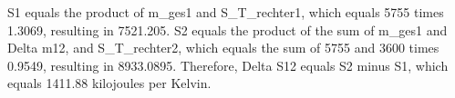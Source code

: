 S1 equals the product of m_ges1 and S_T_rechter1, which equals 5755 times 1.3069, resulting in 7521.205.
S2 equals the product of the sum of m_ges1 and Delta m12, and S_T_rechter2, which equals the sum of 5755 and 3600 times 0.9549, resulting in 8933.0895.
Therefore, Delta S12 equals S2 minus S1, which equals 1411.88 kilojoules per Kelvin.